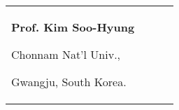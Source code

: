 

\begin{tabularx}{\textwidth}{@{}XX@{}X@{}X}
\textbf{Prof. Kim Soo-Hyung}\par
Chonnam Nat'l Univ.,\par 
Gwangju, South Korea.\par 
\makefield{\faEnvelopeO}{\url{shkim@jnu.ac.kr}}
\\
\end{tabularx}
